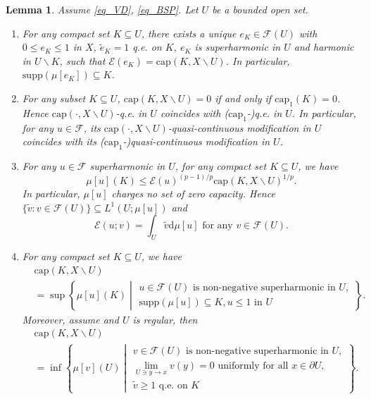 \documentclass[11pt,a4paper]{article}
\numberwithin{equation}{section}
\theoremstyle{plain}
\newtheorem{lemma}[theorem]{Lemma}
\theoremstyle{definition}
\begin{document}
\begin{lemma}\label{lem_cap_dual}
Assume \ref{eq_VD}, \ref{eq_BSP}. Let $U$ be a bounded open set.
\begin{enumerate}[label=(\arabic*)]
\item For any compact set $K\subseteq U$, there exists a unique $e_K\in\mathcal{F}(U)$ with $0\le e_K\le1$ in $X$, $\widetilde{e}_K=1$ q.e. on ${K}$, $e_K$ is superharmonic in $U$ and harmonic in $U\backslash {K}$, such that $\mathcal{E}(e_K)=\mathrm{cap}(K,X\backslash U)$. In particular, $\mathrm{supp}(\mu[e_K])\subseteq {K}$.
\item For any subset $K\subseteq U$, $\mathrm{cap}(K,X\backslash U)=0$ if and only if $\mathrm{cap}_1(K)=0$. Hence $\mathrm{cap}(\cdot,X\backslash U)$-q.e. in $U$ coincides with ($\mathrm{cap}_1$-)q.e. in $U$. In particular, for any $u\in\mathcal{F}$, its $\mathrm{cap}(\cdot,X\backslash U)$-quasi-continuous modification in $U$ coincides with its ($\mathrm{cap}_1$-)quasi-continuous modification in $U$.
\item For any $u\in\mathcal{F}$ superharmonic in $U$, for any compact set $K\subseteq U$, we have
\begin{equation}\label{eq_mu_cap}
\mu[u]({K})\le\mathcal{E}(u)^{(p-1)/p}\mathrm{cap}(K,X\backslash U)^{1/p}.
\end{equation}
In particular, $\mu[u]$ charges no set of zero capacity. Hence $\{\widetilde{v}:v\in\mathcal{F}(U)\}\subseteq L^1(U;\mu[u])$ and
$$\mathcal{E}(u;v)=\int_U\widetilde{v}\mathrm{d}\mu[u]\text{ for any }v\in\mathcal{F}(U).$$
\item For any compact set $K\subseteq U$, we have
\begin{align}
&\mathrm{cap}(K,X\backslash U)\nonumber\\
&=\sup\left\{\mu[u](K)\middle|
\begin{array}{l}
u\in\mathcal{F}(U)\text{ is non-negative superharmonic in }U,\\
\mathrm{supp}(\mu[u])\subseteq K,u\le 1\text{ in }U
\end{array}
\right\}.\label{eq_cap_supchar}
\end{align}
Moreover, assume \hyperlink{eq_LSC}{} and $U$ is regular, then
\begin{align}
&\mathrm{cap}(K,X\backslash U)\nonumber\\
&=\inf\left\{\mu[v](U)\middle|
\begin{array}{l}
v\in\mathcal{F}(U)\text{ is non-negative superharmonic in }U,\\
\lim_{U\ni y\to x}v(y)=0\text{ uniformly for all }x\in\partial U,\\
\widetilde{v}\ge1\text{ q.e. on }K
\end{array}
\right\}.\label{eq_cap_infchar}
\end{align}
\end{enumerate}
\end{lemma}
\end{document}
